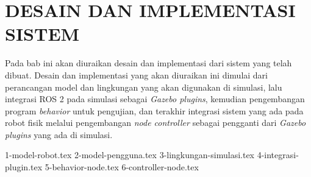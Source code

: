 \chapter{DESAIN DAN IMPLEMENTASI SISTEM}
\label{chap:desainimplementasi}

Pada bab ini akan diuraikan desain dan implementasi dari sistem yang telah dibuat.
Desain dan implementasi yang akan diuraikan ini dimulai dari perancangan model dan lingkungan yang akan digunakan di simulasi,
  lalu integrasi ROS 2 pada simulasi sebagai \emph{Gazebo plugins},
  kemudian pengembangan program \emph{behavior} untuk pengujian,
  dan terakhir integrasi sistem yang ada pada robot fisik melalui pengembangan \emph{node controller} sebagai pengganti dari \emph{Gazebo plugins} yang ada di simulasi.

{1-model-robot.tex}
{2-model-pengguna.tex}
{3-lingkungan-simulasi.tex}
{4-integrasi-plugin.tex}
{5-behavior-node.tex}
{6-controller-node.tex}
